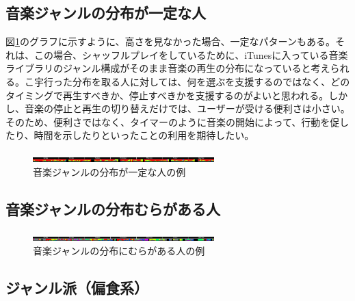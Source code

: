 \documentclass[11pt, twocolumn]{jsarticle}
\begin{document}
\subsection{音楽ジャンルの分布が一定な人}
図\ref{genreMap_regular}のグラフに示すように、高さを見なかった場合、一定なパターンもある。それは、この場合、シャッフルプレイをしているために、iTunesに入っている音楽ライブラリのジャンル構成がそのまま音楽の再生の分布になっていると考えられる。こ宇行った分布を取る人に対しては、何を選ぶを支援するのではなく、どのタイミングで再生すべきか、停止すべきかを支援するのがよいと思われる。しかし、音楽の停止と再生の切り替えだけでは、ユーザーが受ける便利さは小さい。そのため、便利さではなく、タイマーのように音楽の開始によって、行動を促したり、時間を示したりといったことの利用を期待したい。

\begin{figure}[h]
\begin{center}
\includegraphics[width=7cm]{genreMap_regular.jpg}
\caption{音楽ジャンルの分布が一定な人の例}
\label{genreMap_regular}
\end{center}
\end{figure}

\subsection{音楽ジャンルの分布むらがある人}
\begin{figure}[h]
\begin{center}
\includegraphics[width=7cm]{genreMap_irregular.jpg}
\caption{音楽ジャンルの分布にむらがある人の例}
\label{genreMap_irregular}
\end{center}
\end{figure}

\subsection{ジャンル派（偏食系）}
\end{document}
